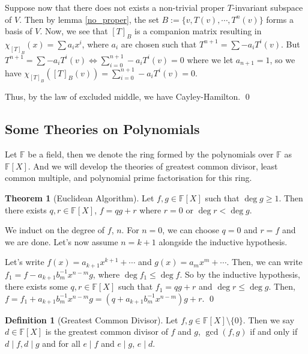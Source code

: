 \documentclass[
]{article}
\theoremstyle{definition}
\newtheorem{theorem}{Theorem}
\theoremstyle{definition}
\newtheorem{definition}{Definition}[section]
\begin{document}
Suppose now that there does not exists a non-trivial proper
\(T\)-invariant subspace of \(V\). Then by lemma \ref{no_proper}, the
set \(B := \{v, T(v), \cdots, T^n(v)\}\) forms a basis of \(V\). Now, we
see that \([T]_B\) is a companion matrix resulting in
\(\chi_{[T]_B}(x) = \sum a_i x^i\), where \(a_i\) are chosen such that
\(T^{n + 1} = \sum -a_i T^i(v)\). But
\(T^{n + 1} = \sum -a_i T^i(v) \iff \sum_{i = 0}^{n + 1} -a_i T^i(v) = 0\)
where we let \(a_{n + 1} = 1\), so we have
\(\chi_{[T]_B}([T]_B(v)) =  \sum_{i = 0}^{n + 1} -a_i T^i(v) = 0\).

Thus, by the law of excluded middle, we have Cayley-Hamilton. \qed

\hypertarget{some-theories-on-polynomials}{%
\subsection{Some Theories on
Polynomials}\label{some-theories-on-polynomials}}

Let \(\mathbb{F}\) be a field, then we denote the ring formed by the
polynomials over \(\mathbb{F}\) as \(\mathbb{F}[X]\). And we will
develop the theories of greatest common divisor, least common multiple,
and polynomial prime factorisation for this ring.

\begin{theorem}[Euclidean Algorithm]
  Let \(f, g \in \mathbb{F}[X]\) such that \(\deg g \ge 1\). Then there 
  exists \(q, r \in \mathbb{F}[X]\), \(f = q g + r\) where \(r = 0\) or 
  \(\deg r < \deg g\).
\end{theorem}
\proof

We induct on the degree of \(f\), \(n\). For \(n = 0\), we can choose
\(q = 0\) and \(r = f\) and we are done. Let's now assume \(n = k + 1\)
alongside the inductive hypothesis.

Let's write \(f(x) = a_{k + 1}x^{k + 1} + \cdots\) and
\(g(x) = a_m x^m + \cdots\). Then, we can write
\(f_1 = f - a_{k + 1} b_m^{-1} x^{n - m} g\), where
\(\deg f_1 \le \deg f\). So by the inductive hypothesis, there exists
some \(q, r \in \mathbb{F}[X]\) such that \(f_1 = q g + r\) and
\(\deg r \le \deg g\). Then,
\(f = f_1 + a_{k + 1} b_m^{-1} x^{n - m} g  = (q + a_{k + 1} b_m^{-1} x^{n - m}) g + r\).
\qed

\begin{definition}[Greatest Common Divisor]
  Let \(f, g \in \mathbb{F}[X] \setminus \{0\}\). Then we say \(d \in \mathbb{F}[X]\) 
  is the greatest common divisor of \(f\) and \(g\), \(\gcd(f, g)\) if and only 
  if \(d \mid f, d \mid g\) and for all \(e \mid f\) and \(e \mid g\), \(e \mid d\). 
\end{definition}
\end{document}
